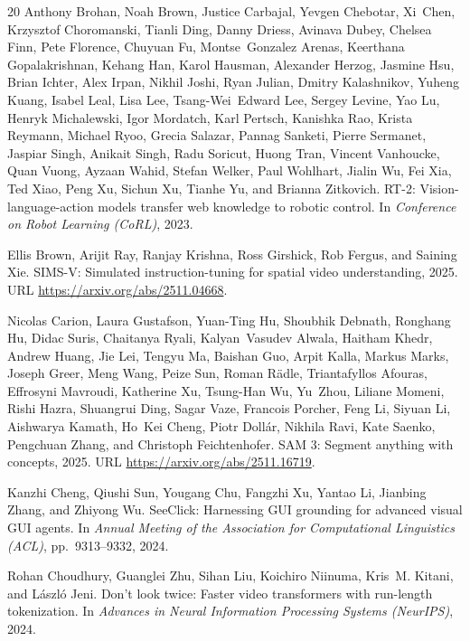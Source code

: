 \documentclass{article}
\begin{document}
\begin{thebibliography}{20}
Anthony Brohan, Noah Brown, Justice Carbajal, Yevgen Chebotar, Xi~Chen, Krzysztof Choromanski, Tianli Ding, Danny Driess, Avinava Dubey, Chelsea Finn, Pete Florence, Chuyuan Fu, Montse~Gonzalez Arenas, Keerthana Gopalakrishnan, Kehang Han, Karol Hausman, Alexander Herzog, Jasmine Hsu, Brian Ichter, Alex Irpan, Nikhil Joshi, Ryan Julian, Dmitry Kalashnikov, Yuheng Kuang, Isabel Leal, Lisa Lee, Tsang-Wei~Edward Lee, Sergey Levine, Yao Lu, Henryk Michalewski, Igor Mordatch, Karl Pertsch, Kanishka Rao, Krista Reymann, Michael Ryoo, Grecia Salazar, Pannag Sanketi, Pierre Sermanet, Jaspiar Singh, Anikait Singh, Radu Soricut, Huong Tran, Vincent Vanhoucke, Quan Vuong, Ayzaan Wahid, Stefan Welker, Paul Wohlhart, Jialin Wu, Fei Xia, Ted Xiao, Peng Xu, Sichun Xu, Tianhe Yu, and Brianna Zitkovich.
\newblock RT-2: Vision-language-action models transfer web knowledge to robotic control.
\newblock In \emph{Conference on Robot Learning (CoRL)}, 2023.

Ellis Brown, Arijit Ray, Ranjay Krishna, Ross Girshick, Rob Fergus, and Saining Xie.
\newblock SIMS-V: Simulated instruction-tuning for spatial video understanding, 2025.
\newblock URL \url{https://arxiv.org/abs/2511.04668}.

Nicolas Carion, Laura Gustafson, Yuan-Ting Hu, Shoubhik Debnath, Ronghang Hu, Didac Suris, Chaitanya Ryali, Kalyan~Vasudev Alwala, Haitham Khedr, Andrew Huang, Jie Lei, Tengyu Ma, Baishan Guo, Arpit Kalla, Markus Marks, Joseph Greer, Meng Wang, Peize Sun, Roman R{\"a}dle, Triantafyllos Afouras, Effrosyni Mavroudi, Katherine Xu, Tsung-Han Wu, Yu~Zhou, Liliane Momeni, Rishi Hazra, Shuangrui Ding, Sagar Vaze, Francois Porcher, Feng Li, Siyuan Li, Aishwarya Kamath, Ho~Kei Cheng, Piotr Doll{\'a}r, Nikhila Ravi, Kate Saenko, Pengchuan Zhang, and Christoph Feichtenhofer.
\newblock SAM 3: Segment anything with concepts, 2025.
\newblock URL \url{https://arxiv.org/abs/2511.16719}.

Kanzhi Cheng, Qiushi Sun, Yougang Chu, Fangzhi Xu, Yantao Li, Jianbing Zhang, and Zhiyong Wu.
\newblock SeeClick: Harnessing GUI grounding for advanced visual GUI agents.
\newblock In \emph{Annual Meeting of the Association for Computational Linguistics (ACL)}, pp.\ 9313--9332, 2024.

Rohan Choudhury, Guanglei Zhu, Sihan Liu, Koichiro Niinuma, Kris~M. Kitani, and L{\'a}szl{\'o} Jeni.
\newblock Don't look twice: Faster video transformers with run-length tokenization.
\newblock In \emph{Advances in Neural Information Processing Systems (NeurIPS)}, 2024.


\end{thebibliography}
\end{document}
